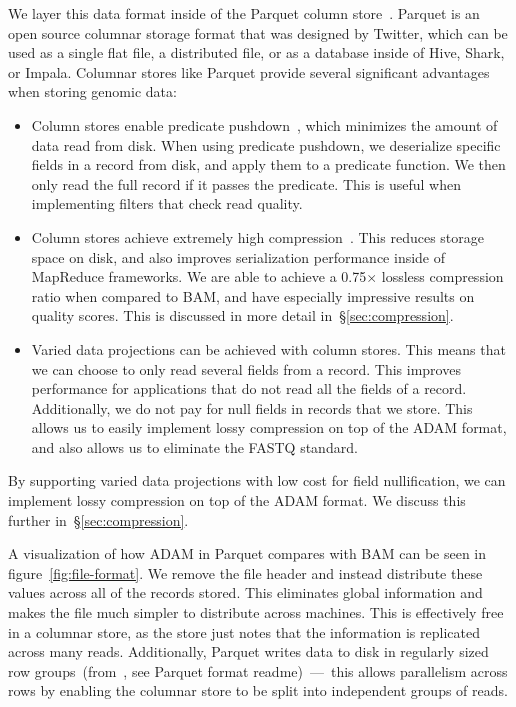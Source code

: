 \documentclass[10pt,twocolumn]{article}
\begin{document}
We layer this data format inside of the Parquet column store~\cite{parquet}. Parquet is an open source columnar storage
format that was designed by Twitter, which can be used as a single flat file, a distributed file, or as a database inside of
Hive, Shark, or Impala. Columnar stores like Parquet provide several significant advantages when storing genomic data:

\begin{itemize}
\item Column stores enable predicate pushdown~\cite{lamb12}, which minimizes the amount of data read from disk. When
using predicate pushdown, we deserialize specific fields in a record from disk, and apply them to a predicate function. We
then only read the full record if it passes the predicate. This is useful when implementing filters that check read quality.
\item Column stores achieve extremely high compression~\cite{abadi06}. This reduces storage space on disk, and also improves
serialization performance inside of MapReduce frameworks. We are able to achieve a 0.75$\times$ lossless compression
ratio when compared to BAM, and have especially impressive results on quality scores. This is discussed in more
detail in~\S\ref{sec:compression}.
\item Varied data projections can be achieved with column stores. This means that we can choose to only read several
fields from a record. This improves performance for applications that do not read all the fields of a record. Additionally,
we do not pay for null fields in records that we store. This allows us to easily implement lossy compression on top of the
ADAM format, and also allows us to eliminate the FASTQ standard.
\end{itemize}

By supporting varied data projections with low cost for field nullification, we can implement lossy compression on top
of the ADAM format. We discuss this further in~\S\ref{sec:compression}.

A visualization of how ADAM in Parquet compares with BAM can be seen in figure~\ref{fig:file-format}. We remove the file header
and instead distribute these values across all of the records stored. This eliminates global information and makes the file much
simpler to distribute across machines. This is effectively free in a columnar store, as the store just notes that the information is
replicated across many reads. Additionally, Parquet writes data to disk in regularly sized row groups~(from~\cite{parquet}, see
Parquet format readme)~---~this allows parallelism across rows by enabling the columnar store to be split into independent
groups of reads.
\end{document}
